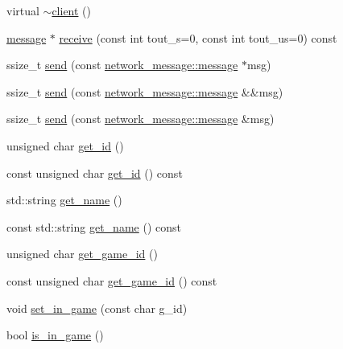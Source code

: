 \begin{DoxyCompactItemize}
\item 
virtual \hyperlink{classbattleship_1_1game__server_1_1client_ac64f89eb976af431e4822dd777bdf320}{$\sim$client} ()
\item 
\hyperlink{classbattleship_1_1network__message_1_1message}{message} $\ast$ \hyperlink{classbattleship_1_1game__server_1_1client_a9824ce38f2f62979bd307487c862db9f}{receive} (const int tout\+\_\+s=0, const int tout\+\_\+us=0) const
\item 
ssize\+\_\+t \hyperlink{classbattleship_1_1game__server_1_1client_a9595ac710bf75e615afeee2a463a0872}{send} (const \hyperlink{classbattleship_1_1network__message_1_1message}{network\+\_\+message\+::message} $\ast$msg)
\item 
ssize\+\_\+t \hyperlink{classbattleship_1_1game__server_1_1client_a53b00e5370ae2f161784172eab1a9fdc}{send} (const \hyperlink{classbattleship_1_1network__message_1_1message}{network\+\_\+message\+::message} \&\&msg)
\item 
ssize\+\_\+t \hyperlink{classbattleship_1_1game__server_1_1client_a1aec51b5386354c5acd2b7a45486f7cc}{send} (const \hyperlink{classbattleship_1_1network__message_1_1message}{network\+\_\+message\+::message} \&msg)
\item 
unsigned char \hyperlink{classbattleship_1_1game__server_1_1client_ac1427b1a3a9dd9f2a0185b6c0d36e1c5}{get\+\_\+id} ()
\item 
const unsigned char \hyperlink{classbattleship_1_1game__server_1_1client_a2829c94437fea654b900dc801750d8ef}{get\+\_\+id} () const
\item 
std\+::string \hyperlink{classbattleship_1_1game__server_1_1client_abb6392156781049b20f0e7490da49840}{get\+\_\+name} ()
\item 
const std\+::string \hyperlink{classbattleship_1_1game__server_1_1client_ab10f638915409ca61ee52838c476e89c}{get\+\_\+name} () const
\item 
unsigned char \hyperlink{classbattleship_1_1game__server_1_1client_a232605975d752a2d5a30a606c5b890c6}{get\+\_\+game\+\_\+id} ()
\item 
const unsigned char \hyperlink{classbattleship_1_1game__server_1_1client_a6152f49fe5202ff8b9bd249071c03406}{get\+\_\+game\+\_\+id} () const
\item 
void \hyperlink{classbattleship_1_1game__server_1_1client_adfd1858da78c5ad2aba9a5528190882b}{set\+\_\+in\+\_\+game} (const char g\+\_\+id)
\item 
bool \hyperlink{classbattleship_1_1game__server_1_1client_ad985a33f008c3c16dbb1a244cabe32db}{is\+\_\+in\+\_\+game} ()

\end{DoxyCompactItemize}
